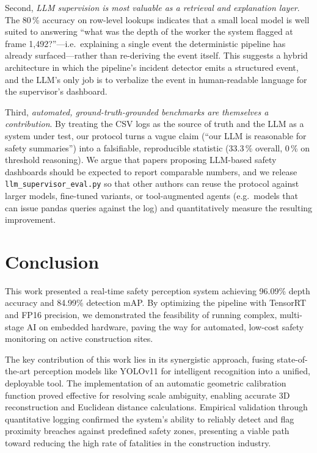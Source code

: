 \documentclass{article}
\begin{document}
Second, \emph{LLM supervision is most valuable as a retrieval and explanation layer}. The 80\,\% accuracy on row-level lookups indicates that a small local model is well suited to answering ``what was the depth of the worker the system flagged at frame 1{,}492?''---i.e.\ explaining a single event the deterministic pipeline has already surfaced---rather than re-deriving the event itself. This suggests a hybrid architecture in which the pipeline's incident detector emits a structured event, and the LLM's only job is to verbalize the event in human-readable language for the supervisor's dashboard.

Third, \emph{automated, ground-truth-grounded benchmarks are themselves a contribution}. By treating the CSV logs as the source of truth and the LLM as a system under test, our protocol turns a vague claim (``our LLM is reasonable for safety summaries'') into a falsifiable, reproducible statistic (33.3\,\% overall, 0\,\% on threshold reasoning). We argue that papers proposing LLM-based safety dashboards should be expected to report comparable numbers, and we release \texttt{llm\_supervisor\_eval.py} so that other authors can reuse the protocol against larger models, fine-tuned variants, or tool-augmented agents (e.g.\ models that can issue pandas queries against the log) and quantitatively measure the resulting improvement.

\section{Conclusion}
This work presented a real-time safety perception system achieving 96.09\% depth accuracy and 84.99\% detection mAP. By optimizing the pipeline with TensorRT and FP16 precision, we demonstrated the feasibility of running complex, multi-stage AI on embedded hardware, paving the way for automated, low-cost safety monitoring on active construction sites.

The key contribution of this work lies in its synergistic approach, fusing state-of-the-art perception models like YOLOv11 \cite{jocher2024} for intelligent recognition into a unified, deployable tool. The implementation of an automatic geometric calibration function proved effective for resolving scale ambiguity, enabling accurate 3D reconstruction and Euclidean distance calculations. Empirical validation through quantitative logging confirmed the system's ability to reliably detect and flag proximity breaches against predefined safety zones, presenting a viable path toward reducing the high rate of fatalities in the construction industry.
\end{document}
